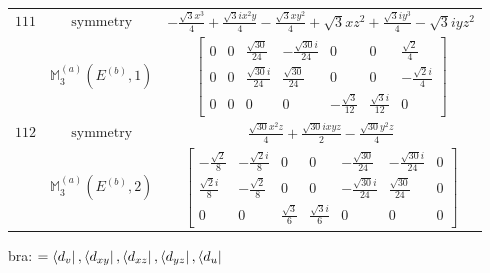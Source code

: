 \documentclass[fleqn,8pt,landscape]{jsarticle}
\begin{document}
\begin{longtable}{ccc}
$ 111 $ & $ \text{symmetry} $ & $ - \frac{\sqrt{3} x^{3}}{4} + \frac{\sqrt{3} i x^{2} y}{4} - \frac{\sqrt{3} x y^{2}}{4} + \sqrt{3} x z^{2} + \frac{\sqrt{3} i y^{3}}{4} - \sqrt{3} i y z^{2} $ \\
$  $ & $ \mathbb{M}_{3}^{(a)}(E^{(b)},1) $ & $ \begin{bmatrix} 0 & 0 & \frac{\sqrt{30}}{24} & - \frac{\sqrt{30} i}{24} & 0 & 0 & \frac{\sqrt{2}}{4} \\ 0 & 0 & \frac{\sqrt{30} i}{24} & \frac{\sqrt{30}}{24} & 0 & 0 & - \frac{\sqrt{2} i}{4} \\ 0 & 0 & 0 & 0 & - \frac{\sqrt{3}}{12} & \frac{\sqrt{3} i}{12} & 0 \end{bmatrix} $ \\ \hline
$ 112 $ & $ \text{symmetry} $ & $ \frac{\sqrt{30} x^{2} z}{4} + \frac{\sqrt{30} i x y z}{2} - \frac{\sqrt{30} y^{2} z}{4} $ \\
$  $ & $ \mathbb{M}_{3}^{(a)}(E^{(b)},2) $ & $ \begin{bmatrix} - \frac{\sqrt{2}}{8} & - \frac{\sqrt{2} i}{8} & 0 & 0 & - \frac{\sqrt{30}}{24} & - \frac{\sqrt{30} i}{24} & 0 \\ \frac{\sqrt{2} i}{8} & - \frac{\sqrt{2}}{8} & 0 & 0 & - \frac{\sqrt{30} i}{24} & \frac{\sqrt{30}}{24} & 0 \\ 0 & 0 & \frac{\sqrt{3}}{6} & \frac{\sqrt{3} i}{6} & 0 & 0 & 0 \end{bmatrix} $ \\ \hline
\end{longtable}
bra: $=\bra{d_{v}}, \bra{d_{xy}}, \bra{d_{xz}}, \bra{d_{yz}}, \bra{d_{u}}$
\end{document}
